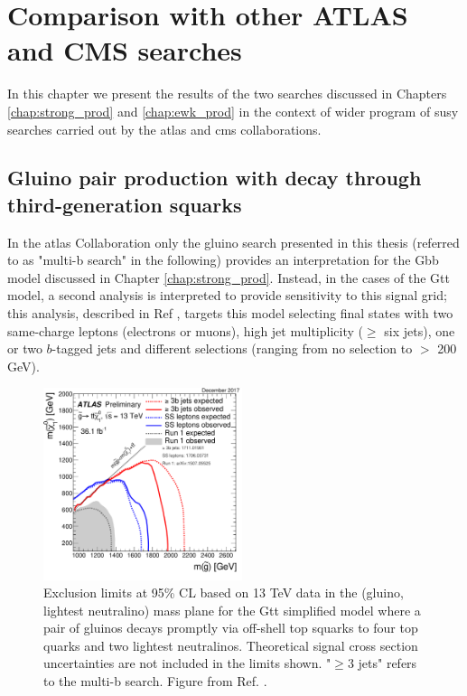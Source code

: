 \chapter{Comparison with other ATLAS and CMS searches}
\label{chap:summary_susy}

In this chapter we present the results of the two searches discussed in Chapters \ref{chap:strong_prod} and \ref{chap:ewk_prod} in the context of
wider program of \gls{susy} searches carried out by the \gls{atlas} and \gls{cms} collaborations. 

\section{Gluino pair production with decay through third-generation squarks}

In the \gls{atlas} Collaboration only the gluino search presented in this thesis (referred to as "multi-b search" in the following) 
provides an interpretation for the Gbb model 
discussed in Chapter \ref{chap:strong_prod}.
Instead, in the cases of the Gtt model, a second analysis is interpreted to provide sensitivity  to this 
signal grid; this analysis, described in Ref \cite{Aaboud:2017dmy}, targets this model selecting final states with two same-charge 
leptons (electrons or muons), high jet multiplicity ($\geq$ six jets), one or two $b$-tagged jets and different \met selections 
(ranging from no \met selection to \met $>$ 200 GeV).

\begin{figure}[htbp]
	\centering
	\includegraphics[width=0.52\textwidth]{figures/summary_plots/ATLAS_SUSY_Gtt.pdf}
	\caption{Exclusion limits at 95\% CL based on 13 TeV data in the (gluino, lightest neutralino) 
	mass plane for the Gtt simplified model where a pair of gluinos decays promptly via off-shell top 
	squarks to four top quarks and two lightest neutralinos. Theoretical signal cross section uncertainties are 
	not included in the limits shown. "$\geq 3$ jets" refers to the multi-b search. Figure from Ref. \cite{atlasSUSYSummary}.
	} 
	\label{fig:summary_atlas_Gtt}
\end{figure}

